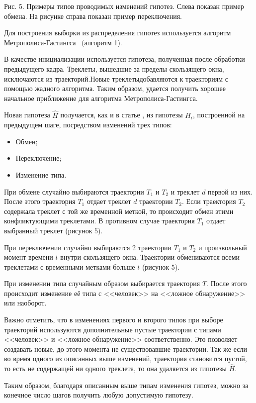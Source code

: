 Рис. 5. Примеры типов проводимых изменений гипотез. Слева показан пример обмена. На рисунке справа показан пример переключения.

Для построения выборки из распределения гипотез используется алгоритм Метрополиса-Гастингса~\cite{oh2004markov} (алгоритм 1).

В качестве инициализации используется гипотеза, полученная после обработки предыдущего кадра. Треклеты, вышедшие за пределы скользящего окна, исключаются из траекторий.Новые треклетыдобавляются к траекториям с помощью жадного алгоритма. Таким образом, удается получить хорошее начальное приближение для алгоритма Метрополиса-Гастингса.

Новая гипотеза $\hat{H}$ получается, как и в статье \cite{benfold2011stable}, из гипотезы $H_i$, построенной на предыдущем шаге, посредством изменений трех типов:
\begin{itemize}
	\item Обмен;
	\item Переключение;
	\item Изменение типа.
\end{itemize}
При обмене случайно выбираются траектории $T_1$ и $T_2$ и треклет $d$ первой из них. После этого траектория $T_1$ отдает треклет $d$ траектории $T_2$. Если траектория $T_2$ содержала треклет с той же временной меткой, то происходит обмен этими конфликтующими треклетами. В противном случае траектория $T_1$ отдает выбранный треклет (рисунок 5).

При переключении случайно выбираются 2 траектории $T_1$ и $T_2$ и произвольный момент времени $t$ внутри скользящего окна. Траектории обмениваются всеми треклетами с временными метками больше $t$ (рисунок 5).

При изменении типа случайным образом выбирается траектория $T$. После этого происходит изменение её типа с <<человек>> на <<ложное обнаружение>> или наоборот.

Важно отметить, что в изменениях первого и второго типов при выборе траекторий используются дополнительные пустые траектории с типами <<человек>> и <<ложное обнаружение>> соответственно. Это позволяет создавать новые, до этого момента не существовавшие траектории. Так же если во время одного из описанных выше изменений, траектория становится пустой, то есть не содержащей ни одного треклета, то она удаляется из гипотезы $\hat{H}$.


Таким образом, благодаря описанным выше типам изменения гипотез, можно за конечное число шагов получить любую допустимую гипотезу.

